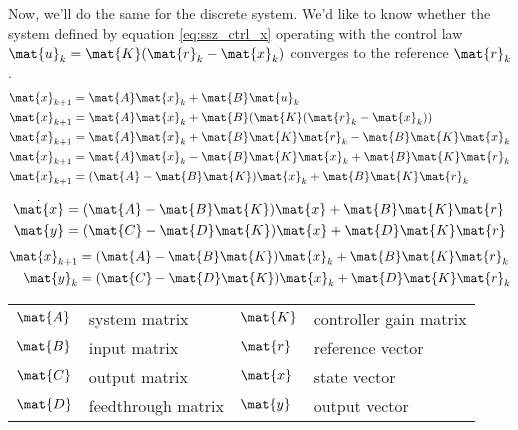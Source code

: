 Now, we'll do the same for the discrete \gls{system}. We'd like to know whether
the \gls{system} defined by equation \eqref{eq:ssz_ctrl_x} operating with the
\gls{control law} $\mat{u}_k = \mat{K}(\mat{r}_k - \mat{x}_k)$ converges to the
\gls{reference} $\mat{r}_k$.
\begin{align*}
  \mat{x}_{k+1} &= \mat{A}\mat{x}_k + \mat{B}\mat{u}_k \\
  \mat{x}_{k+1} &= \mat{A}\mat{x}_k + \mat{B}(\mat{K}(\mat{r}_k - \mat{x}_k)) \\
  \mat{x}_{k+1} &= \mat{A}\mat{x}_k + \mat{B}\mat{K}\mat{r}_k -
    \mat{B}\mat{K}\mat{x}_k \\
  \mat{x}_{k+1} &= \mat{A}\mat{x}_k - \mat{B}\mat{K}\mat{x}_k +
    \mat{B}\mat{K}\mat{r}_k \\
  \mat{x}_{k+1} &= (\mat{A} - \mat{B}\mat{K})\mat{x}_k + \mat{B}\mat{K}\mat{r}_k
\end{align*}
\begin{theorem}
  \begin{align}
    \dot{\mat{x}} &= (\mat{A} - \mat{B}\mat{K})\mat{x} + \mat{B}\mat{K}\mat{r}
      \label{eq:s_ref_ctrl_x} \\
    \mat{y} &= (\mat{C} - \mat{D}\mat{K})\mat{x} + \mat{D}\mat{K}\mat{r}
  \end{align}
  \begin{align}
    \mat{x}_{k+1} &= (\mat{A} - \mat{B}\mat{K})\mat{x}_k +
      \mat{B}\mat{K}\mat{r}_k \label{eq:z_ref_ctrl_x} \\
    \mat{y}_k &= (\mat{C} - \mat{D}\mat{K})\mat{x}_k + \mat{D}\mat{K}\mat{r}_k
  \end{align}
  \begin{figurekey}
    \begin{tabular}{llll}
      $\mat{A}$ & system matrix      & $\mat{K}$ & controller gain matrix \\
      $\mat{B}$ & input matrix       & $\mat{r}$ & \gls{reference} vector \\
      $\mat{C}$ & output matrix      & $\mat{x}$ & state vector \\
      $\mat{D}$ & feedthrough matrix & $\mat{y}$ & output vector \\
    \end{tabular}
  \end{figurekey}
\end{theorem}

